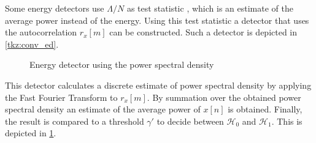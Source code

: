 \documentclass[a4paper, openany, oneside]{memoir}
\begin{document}
Some energy detectors use $\Lambda/N$ as test statistic \cite{chang2008sensing}, which is an estimate of the average power instead of the energy. Using this test statistic a detector that uses the autocorrelation $r_x[m]$ can be constructed. Such a detector is depicted in \cref{tkz:conv_ed}.
\begin{figure}[H]
\centering
{}
\caption{Energy detector using the power spectral density}
\label{tkz:ed_psd}
\end{figure}
This detector calculates a discrete estimate of power spectral density by applying the Fast Fourier Transform to $r_x[m]$. By summation over the obtained power spectral density an estimate of the average power of $x[n]$ is obtained. Finally, the result is compared to a threshold $\gamma'$  to decide between $\mathcal{H}_0$ and $\mathcal{H}_1$. This is depicted in \cref{tkz:ed_psd}.
\end{document}
